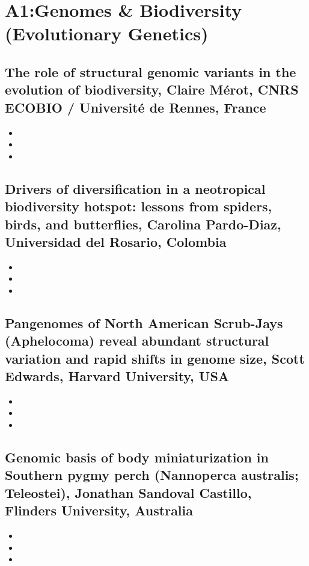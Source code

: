 \documentclass[document.tex]{subfiles}
\begin{document}
\section{A1:Genomes & Biodiversity (Evolutionary Genetics)}
    
        \subsection{The role of structural genomic variants in the evolution of biodiversity, Claire Mérot, CNRS ECOBIO / Université de Rennes, France}
        \begin{itemize}
        \item 
        \item 
        \item 
        \end{itemize}

        \subsection{Drivers of diversification in a neotropical biodiversity hotspot: lessons from spiders, birds, and butterflies, Carolina Pardo-Diaz, Universidad del Rosario, Colombia}
        \begin{itemize}
        \item 
        \item 
        \item 
        \end{itemize}

        \subsection{Pangenomes of North American Scrub-Jays (Aphelocoma) reveal abundant structural variation and rapid shifts in genome size, Scott Edwards, Harvard University, USA}
        \begin{itemize}
        \item 
        \item 
        \item 
        \end{itemize}

        \subsection{Genomic basis of body miniaturization in Southern pygmy perch (Nannoperca australis; Teleostei), Jonathan Sandoval Castillo, Flinders University, Australia}
        \begin{itemize}
        \item 
        \item 
        \item 
        \end{itemize}
\end{document}
